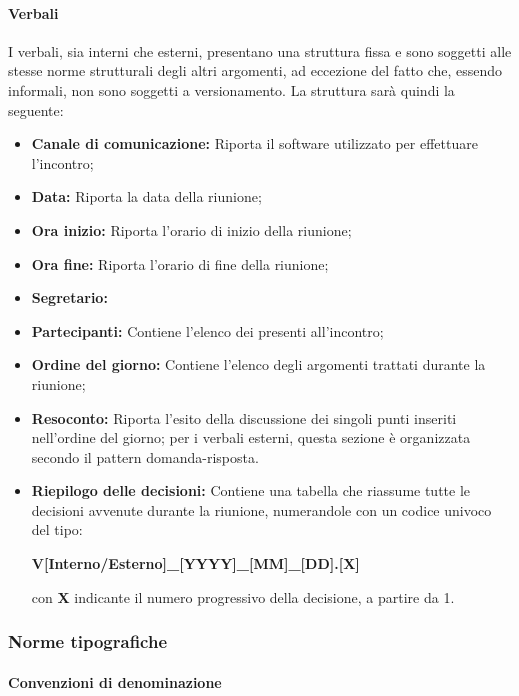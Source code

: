\paragraph{Verbali}

I verbali, sia interni che esterni, presentano una struttura fissa e sono soggetti alle stesse norme strutturali degli altri argomenti, ad eccezione del fatto che, essendo informali, non sono soggetti a versionamento.
La struttura sarà quindi la seguente:

\begin{itemize}

	\item \textbf{Canale di comunicazione:} Riporta il software utilizzato per effettuare l'incontro;
	\item \textbf{Data:} Riporta la data della riunione;
	\item \textbf{Ora inizio:} Riporta l'orario di inizio della riunione;
	\item \textbf{Ora fine:} Riporta l'orario di fine della riunione;
	\item \textbf{Segretario:} 
	\item \textbf{Partecipanti:} Contiene l'elenco dei presenti all'incontro;   
	\item \textbf{Ordine del giorno:} Contiene l'elenco degli argomenti trattati durante la riunione;
	\item \textbf{Resoconto:} Riporta l'esito della discussione dei singoli punti inseriti nell'ordine del giorno; per i verbali esterni, questa sezione è organizzata secondo il pattern domanda-risposta.
	\item \textbf{Riepilogo delle decisioni:}  Contiene una tabella che riassume tutte le decisioni avvenute durante la riunione, numerandole con un codice univoco del tipo: \newline 
	\centerline{\textbf{V[Interno/Esterno]\_[YYYY]\_[MM]\_[DD].[X]}}\newline con \textbf{X} indicante il numero progressivo della decisione, a partire da 1.

\end{itemize}


\subsubsection{Norme tipografiche}

\paragraph{Convenzioni di denominazione}

